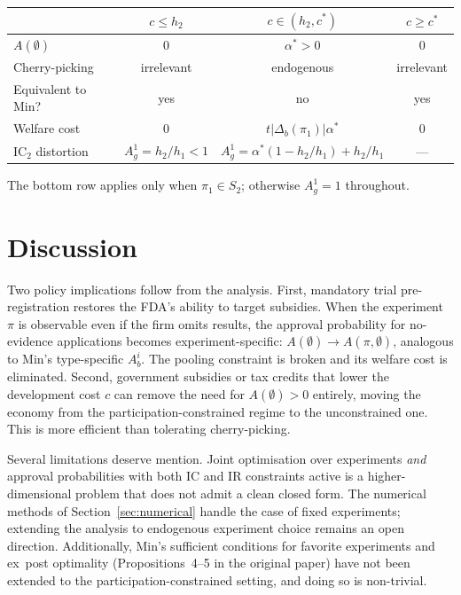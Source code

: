 \documentclass[12pt,a4paper]{article}
\begin{document}
\begin{center}
\renewcommand{\arraystretch}{1.3}
\begin{tabular}{@{}lccc@{}}
\toprule
 & $c \leq h_2$ & $c \in (h_2, c^*)$ & $c \geq c^*$ \\
\midrule
$A(\emptyset)$ & $0$ & $\alpha^* > 0$ & $0$ \\
Cherry-picking & irrelevant & endogenous & irrelevant \\
Equivalent to Min? & yes & no & yes \\
Welfare cost & $0$ & $t|\Delta_b(\pi_1)|\alpha^*$ & $0$ \\
\midrule
IC$_2$ distortion &
  $A_g^1 = h_2/h_1 < 1$ &
  $A_g^1 = \alpha^*(1{-}h_2/h_1) + h_2/h_1$ &
  --- \\
\bottomrule
\end{tabular}
\end{center}

The bottom row applies only when $\pi_1 \in S_2$; otherwise
$A_g^1 = 1$ throughout.


\section{Discussion}
\label{sec:discussion}

Two policy implications follow from the analysis. First,
mandatory trial pre-registration restores the FDA's ability
to target subsidies. When the experiment $\pi$ is observable
even if the firm omits results, the approval probability for
no-evidence applications becomes experiment-specific:
$A(\emptyset) \to A(\pi, \emptyset)$, analogous to Min's
type-specific $A_b^i$. The pooling constraint is broken and
its welfare cost is eliminated. Second, government subsidies
or tax credits that lower the development cost $c$ can remove
the need for $A(\emptyset) > 0$ entirely, moving the economy
from the participation-constrained regime to the
unconstrained one. This is more efficient than tolerating
cherry-picking.

Several limitations deserve mention. Joint optimisation over
experiments \emph{and} approval probabilities with both IC
and IR constraints active is a higher-dimensional problem
that does not admit a clean closed form. The numerical
methods of Section~\ref{sec:numerical} handle the case of
fixed experiments; extending the analysis to endogenous
experiment choice remains an open direction. Additionally,
Min's sufficient conditions for favorite experiments and
ex~post optimality (Propositions~4--5 in the original paper)
have not been extended to the participation-constrained
setting, and doing so is non-trivial.
\end{document}
